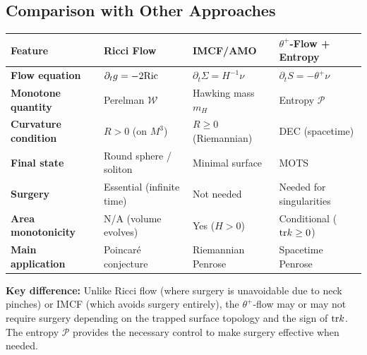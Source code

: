 \subsection{Comparison with Other Approaches}

\begin{center}
\begin{tabular}{p{3cm}|p{4cm}|p{4cm}|p{4cm}}
\toprule
\textbf{Feature} & \textbf{Ricci Flow} & \textbf{IMCF/AMO} & \textbf{$\theta^+$-Flow + Entropy} \\
\midrule
\textbf{Flow equation} & $\partial_t g = -2\mathrm{Ric}$ & $\partial_t \Sigma = H^{-1}\nu$ & $\partial_t S = -\theta^+\nu$ \\
\midrule
\textbf{Monotone quantity} & Perelman $\mathcal{W}$ & Hawking mass $m_H$ & Entropy $\mathcal{P}$ \\
\midrule
\textbf{Curvature condition} & $R > 0$ (on $M^3$) & $R \geq 0$ (Riemannian) & DEC (spacetime) \\
\midrule
\textbf{Final state} & Round sphere / soliton & Minimal surface & MOTS \\
\midrule
\textbf{Surgery} & Essential (infinite time) & Not needed & Needed for singularities \\
\midrule
\textbf{Area monotonicity} & N/A (volume evolves) & Yes ($H > 0$) & Conditional ($\mathrm{tr} k \geq 0$) \\
\midrule
\textbf{Main application} & Poincar\'e conjecture & Riemannian Penrose & Spacetime Penrose \\
\bottomrule
\end{tabular}
\end{center}

\textbf{Key difference:} Unlike Ricci flow (where surgery is unavoidable due to neck pinches) or IMCF (which avoids surgery entirely), the $\theta^+$-flow may or may not require surgery depending on the trapped surface topology and the sign of $\mathrm{tr} k$. The entropy $\mathcal{P}$ provides the necessary control to make surgery effective when needed.


